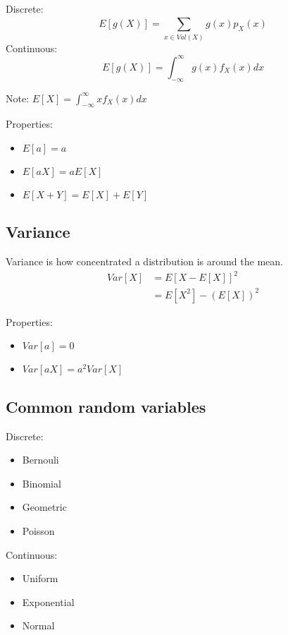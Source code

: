 \documentclass{article}
\begin{document}
    Discrete:
    \begin{equation}
        E[g(X)] = \sum_{x \in Val(X)}^{} g(x)p_X(x)
    \end{equation}
    Continuous:
    \begin{equation}
        E[g(X)] = \int_{- \infty}^{\infty} g(x)f_X(x)dx
    \end{equation}
    \setlength{\parskip}{6pt}

    Note: $E[X] = \int_{- \infty}^{\infty} xf_X(x)dx$ 

    Properties:
    \begin{itemize}
        \item $E[a] = a$
        \item $E[aX] = aE[X]$
        \item $E[X + Y] = E[X] + E[Y]$
    \end{itemize}

    \subsection{Variance}
    Variance is how concentrated a distribution is around the mean. 
    \begin{align}
        Var[X] & = E[X-E[X]]^2 \\
        & = E[X^2] - (E[X])^2
    \end{align}

    Properties:
    \begin{itemize}
        \item $Var[a] = 0$
        \item $Var[aX] = a^2Var[X]$
    \end{itemize}

    \subsection{Common random variables}
    Discrete:
    \begin{itemize}
        \item Bernouli
        \item Binomial
        \item Geometric
        \item Poisson
    \end{itemize}
    Continuous:
    \begin{itemize}
        \item Uniform
        \item Exponential
        \item Normal
    \end{itemize}
\end{document}
